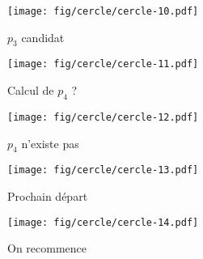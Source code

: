 \documentclass{beamer}
\begin{document}
\begin{frame}
\begin{columns}[t]
\begin{column}{6cm}
{\begin{figure}[h!]
    \end{figure}
    }
    {
      \begin{figure}[h!]
        \centering
        \texttt{[image: fig/cercle/cercle-10.pdf]}
        \caption{$p_{3}$ candidat}
    \end{figure}
    }
    {
      \begin{figure}[h!]
        \centering
        \texttt{[image: fig/cercle/cercle-11.pdf]}
        \caption{Calcul de $p_{4}$ ?}
    \end{figure}
    }
    {
      \begin{figure}[h!]
        \centering
        \texttt{[image: fig/cercle/cercle-12.pdf]}
        \caption{$p_{4}$ n'existe pas}
    \end{figure}
    }
    {
      \begin{figure}[h!]
        \centering
        \texttt{[image: fig/cercle/cercle-13.pdf]}
        \caption{Prochain départ}
    \end{figure}
    }
    {
      \begin{figure}[h!]
        \centering
        \texttt{[image: fig/cercle/cercle-14.pdf]}
        \caption{On recommence}
    \end{figure}
    }

  \end{column}
\end{columns} 

\end{frame}
    
\end{document}
